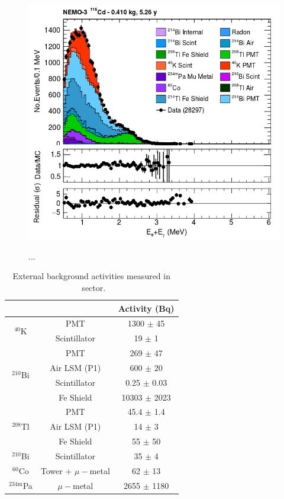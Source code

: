 \documentclass[main.tex]{subfiles}
\begin{document}
\begin{figure}[h!]
\centering
\includegraphics[scale=0.35]{pictures/Chap6/g-eChannelEtot.png}
\label{egChannel_Etot}
\caption{...}
\end{figure}


\begin{table}
\centering
\begin{tabular}{cc|c}
                                   &              &  Activity (Bq)   \\
\midrule
\multirow{2}{*}{$^{\text{40}}$K}   & PMT          & 1300  $\pm$ 45   \\
                                   & Scintillator & 19    $\pm$ 1    \\
\midrule
\multirow{4}{*}{$^{\text{210}}$Bi} & PMT          & 269   $\pm$ 47   \\
                                   & Air LSM (P1) & 600   $\pm$ 20   \\
                                   & Scintillator & 0.25  $\pm$ 0.03 \\
                                   & Fe Shield    & 10303 $\pm$ 2023 \\
\midrule
\multirow{3}{*}{$^{\text{208}}$Tl} & PMT          & 45.4   $\pm$ 1.4 \\
                                   & Air LSM (P1) & 14     $\pm$ 3   \\
                                   & Fe Shield    & 55     $\pm$ 50  \\
\midrule
$^{\text{210}}$Bi                  & Scintillator & 35     $\pm$ 4  \\
\midrule
$^{\text{60}}$Co                   & Tower + $\mu-$metal & 62 $\pm$ 13  \\
\midrule
$^{\text{234m}}$Pa                 & $\mu-$metal & 2655 $\pm$ 1180  \\
\bottomrule
\end{tabular}
\caption{External background activities measured in \Cd~sector.}
\label{TableOCE-activityMeasurement}
\end{table}
\end{document}
